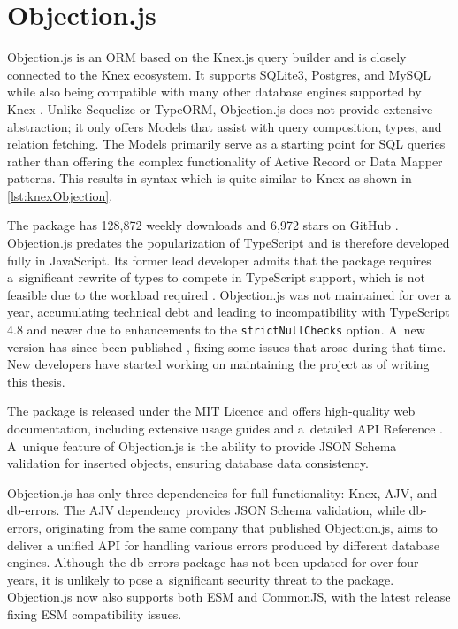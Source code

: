 \section{Objection.js}
Objection.js is an ORM based on the Knex.js query builder and is closely
connected to the Knex ecosystem. It supports SQLite3, Postgres, and MySQL while
also being compatible with many other database engines supported by Knex
\cite{objectionGitHub}. Unlike Sequelize or TypeORM, Objection.js does not
provide extensive abstraction; it only offers Models that assist with query
composition, types, and relation fetching. The Models primarily serve as a
starting point for SQL queries rather than offering the complex functionality of
Active Record or Data Mapper patterns. This results in syntax which is quite
similar to Knex as shown in \autoref{lst:knexObjection}.

The package has 128,872 weekly downloads \cite{objectionNpm} and 6,972 stars on
GitHub \cite{objectionGitHub}. Objection.js predates the popularization of
TypeScript and is therefore developed fully in JavaScript. Its former lead
developer admits that the package requires a~significant rewrite of types to
compete in TypeScript support, which is not feasible due to the workload
required \cite{objectionFuture}. Objection.js was not maintained for over a
year, accumulating technical debt and leading to incompatibility with TypeScript
4.8 and newer due to enhancements to the \texttt{strictNullChecks} option. A~new
version has since been published \cite{objection302}, fixing some issues that
arose during that time. New developers have started working on maintaining the
project as of writing this thesis.

The package is released under the MIT Licence and offers high-quality web
documentation, including extensive usage guides and a~detailed API Reference
\cite{objectionDocs}. A~unique feature of Objection.js is the ability to provide
JSON Schema validation for inserted objects, ensuring database data consistency.

Objection.js has only three dependencies for full functionality: Knex, AJV, and
db-errors. The AJV dependency provides JSON Schema validation, while db-errors,
originating from the same company that published Objection.js, aims to deliver a
unified API for handling various errors produced by different database engines.
Although the db-errors package has not been updated for over four years, it is
unlikely to pose a~significant security threat to the package. Objection.js now
also supports both ESM and CommonJS, with the latest release fixing ESM
compatibility issues.

